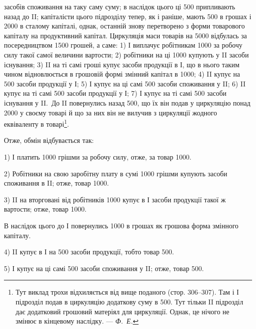 \parcont{}  %
засобів споживання на таку саму суму; в наслідок цього ці 500
припливають назад до II; капіталісти цього підрозділу тепер, як і раніше,
мають 500 в грошах і 2000 в сталому капіталі,
однак, останній знову перетворено з форми товарового капіталу на продуктивний
капітал. Циркуляція маси товарів на 5000 відбулась
за посередництвом 1500 грошей, а саме: 1) І виплачує робітникам
1000 за робочу силу такої самої величини вартости;
2) робітники на ці 1000 купують у II засоби існування;
3) II на ті самі гроші купує засоби продукції в І, що в нього таким
чином відновлюється в грошовій формі змінний капітал в 1000;
4) II купує на 500 засоби продукції у І;
5) І купує на ці самі 500 засоби споживання у II;
6) II купує на ті самі 500 засоби продукції у І;
7) І купує на ті самі 500 засоби
існування у II.~До II повернулись назад 500, що їх він подав у
циркуляцію понад 2000 у своєму товарі й що за них він не
вилучив з циркуляції жодного еквіваленту в товарі\footnote{
Тут виклад трохи відхиляється від вище поданого (стор. 306--307). Там і
І підрозділ подав в циркуляцію додаткову суму в 500. Тут тільки II підрозділ дає
додатковий грошовий матеріял для циркуляції. Однак, це нічого не змінює в
кінцевому наслідку. — \emph{Ф.~Е.}}.

Отже, обмін відбувається так:

1) І платить 1000 грішми за робочу силу, отже, за товар \deq{} 1000.

2) Робітники на свою заробітну плату в сумі 1000 грішми
купують засоби споживання в II; отже, товар \deq{} 1000.

3) II на вторговані від робітників 1000 купує в І засоби
продукції такої ж вартости; отже, товар \deq{} 1000.

В наслідок цього до І повернулись 1000 в грошах як грошова
форма змінного капіталу.

4) II купує в І на 500 засоби продукції, тобто товар \deq{}
500.

5) І купує на ці самі 500 засоби споживання у II; отже,
товар \deq{} 500.

